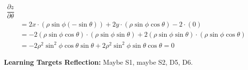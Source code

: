 \begin{enumerate}[leftmargin=0pt]
\begin{enumerate}
\begin{red}
\begin{align*}
            \dfrac{\partial z}{\partial\theta} \\
            &= 2x\cdot(\rho\sin\phi(-\sin\theta)) 
            + 2y\cdot(\rho\sin\phi\cos\theta)
            -2 \cdot (0) \\
            &= -2(\rho\sin\phi\cos\theta)\cdot(\rho\sin\phi\sin\theta) 
            +2(\rho\sin\phi\sin\theta)\cdot(\rho\sin\phi\cos\theta) \\
            &= -2\rho^2\sin^2\phi\cos\theta\sin\theta + 2\rho^2\sin^2\phi\sin\theta\cos\theta = 0
        \end{align*}
        \end{red}
    \end{enumerate}
\end{enumerate}

\begin{red}
\textbf{Learning Targets Reflection:} Maybe S1, maybe S2, D5, D6.
\end{red}

